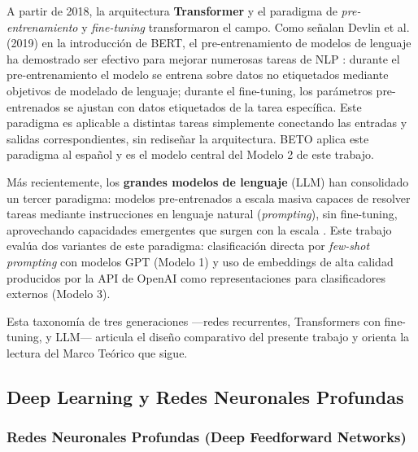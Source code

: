 \documentclass[11pt,a4paper]{article}
\begin{document}
A partir de 2018, la arquitectura \textbf{Transformer} y el paradigma de \emph{pre-entrenamiento} y \emph{fine-tuning} transformaron el campo. Como señalan Devlin et al. (2019) en la introducción de BERT, el pre-entrenamiento de modelos de lenguaje ha demostrado ser efectivo para mejorar numerosas tareas de NLP \cite{devlin2019}: durante el pre-entrenamiento el modelo se entrena sobre datos no etiquetados mediante objetivos de modelado de lenguaje; durante el fine-tuning, los parámetros pre-entrenados se ajustan con datos etiquetados de la tarea específica. Este paradigma es aplicable a distintas tareas simplemente conectando las entradas y salidas correspondientes, sin rediseñar la arquitectura. BETO \cite{canete2020} aplica este paradigma al español y es el modelo central del Modelo 2 de este trabajo.

Más recientemente, los \textbf{grandes modelos de lenguaje} (LLM) han consolidado un tercer paradigma: modelos pre-entrenados a escala masiva capaces de resolver tareas mediante instrucciones en lenguaje natural (\emph{prompting}), sin fine-tuning, aprovechando capacidades emergentes que surgen con la escala \cite{zhao2023}. Este trabajo evalúa dos variantes de este paradigma: clasificación directa por \emph{few-shot prompting} con modelos GPT (Modelo 1) y uso de embeddings de alta calidad producidos por la API de OpenAI como representaciones para clasificadores externos (Modelo 3).

Esta taxonomía de tres generaciones ---redes recurrentes, Transformers con fine-tuning, y LLM--- articula el diseño comparativo del presente trabajo y orienta la lectura del Marco Teórico que sigue.

\subsection{Deep Learning y Redes Neuronales Profundas}

\subsubsection{Redes Neuronales Profundas (Deep Feedforward Networks)}
\end{document}
